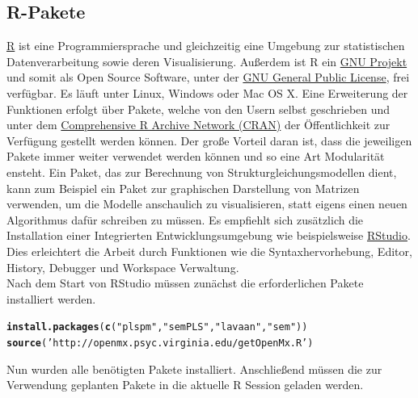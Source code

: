\documentclass{article}\usepackage[]{graphicx}\usepackage[]{color}
\makeatletter
\newcommand{\hlstr}[1]{\textcolor[rgb]{0.192,0.494,0.8}{#1}}%
\newcommand{\hlstd}[1]{\textcolor[rgb]{0.345,0.345,0.345}{#1}}%
\newcommand{\hlkwd}[1]{\textcolor[rgb]{0.737,0.353,0.396}{\textbf{#1}}}%
\newenvironment{kframe}{%
 \def\at@end@of@kframe{}%
 \ifinner\ifhmode%
  \def\at@end@of@kframe{\end{minipage}}%
  \begin{minipage}{\columnwidth}%
 \fi\fi%
 \def\FrameCommand##1{\hskip\@totalleftmargin \hskip-\fboxsep
 \colorbox{shadecolor}{##1}\hskip-\fboxsep
     \hskip-\linewidth \hskip-\@totalleftmargin \hskip\columnwidth}%
 \MakeFramed {\advance\hsize-\width
   \@totalleftmargin\z@ \linewidth\hsize
   \@setminipage}}%
 {\par\unskip\endMakeFramed%
 \at@end@of@kframe}
\newenvironment{knitrout}{}{} %
\makeatother
\begin{document}
\subsection{R-Pakete}
\href{http://www.r-project.org/}{R} ist eine Programmiersprache und gleichzeitig eine Umgebung zur statistischen Datenverarbeitung sowie deren Visualisierung. Außerdem ist R ein \href{http://www.gnu.org/}{GNU Projekt} und somit als Open Source Software, unter der \href{http://www.r-project.org/COPYING}{GNU General Public License}, frei verfügbar. Es läuft unter Linux, Windows oder Mac OS X. Eine Erweiterung der Funktionen erfolgt über Pakete, welche von den Usern selbst geschrieben und unter dem \href{http://cran.r-project.org/}{Comprehensive R Archive Network (CRAN)} der Öffentlichkeit zur Verfügung gestellt werden können. Der große Vorteil daran ist, dass die jeweiligen Pakete immer weiter verwendet werden können und so eine Art Modularität ensteht. Ein Paket, das zur Berechnung von Strukturgleichungsmodellen dient, kann zum Beispiel ein Paket zur graphischen Darstellung von Matrizen verwenden, um die Modelle anschaulich zu visualisieren, statt eigens einen neuen Algorithmus dafür schreiben zu müssen. Es empfiehlt sich zusätzlich die Installation einer Integrierten Entwicklungsumgebung wie beispielsweise \href{http://www.rstudio.com/}{RStudio}. Dies erleichtert die Arbeit durch Funktionen wie die Syntaxhervorhebung, Editor, History, Debugger und Workspace Verwaltung.\\
Nach dem Start von RStudio müssen zunächst die erforderlichen Pakete installiert werden. 

\begin{knitrout}
\color{fgcolor}\begin{kframe}
\begin{alltt}
\hlkwd{install.packages}\hlstd{(}\hlkwd{c}\hlstd{(}\hlstr{"plspm"}\hlstd{,}\hlstr{"semPLS"}\hlstd{,}\hlstr{"lavaan"}\hlstd{,}\hlstr{"sem"}\hlstd{))}
\hlkwd{source}\hlstd{(}\hlstr{'http://openmx.psyc.virginia.edu/getOpenMx.R'}\hlstd{)}
\end{alltt}
\end{kframe}
\end{knitrout}
Nun wurden alle benötigten Pakete installiert. Anschließend müssen die zur Verwendung geplanten Pakete in die aktuelle R Session geladen werden.
\end{document}
